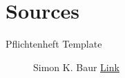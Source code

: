 \section{Sources}


\begin{description}
	\item[Pflichtenheft Template]
	Simon K. Baur
	\href{http://www.linux-magazin.de/Media/Linux-Magazin/Files/latex}{Link}
\end{description}
